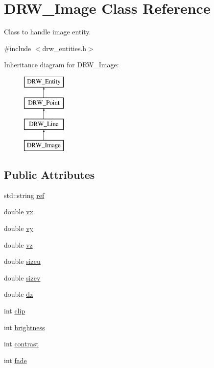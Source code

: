 \hypertarget{class_d_r_w___image}{}\section{D\+R\+W\+\_\+\+Image Class Reference}
\label{class_d_r_w___image}


Class to handle image entity.  




{\ttfamily \#include $<$drw\+\_\+entities.\+h$>$}

Inheritance diagram for D\+R\+W\+\_\+\+Image\+:\begin{figure}[H]
\begin{center}
\leavevmode
\includegraphics[height=4.000000cm]{d2/d07/class_d_r_w___image}
\end{center}
\end{figure}
\subsection*{Public Attributes}
\begin{DoxyCompactItemize}
\item 
std\+::string \hyperlink{class_d_r_w___image_a48302a8438fec582402a1c14126ffd5a}{ref}
\item 
double \hyperlink{class_d_r_w___image_a1f7b4a2b11aed54038b1e978a8d99527}{vx}
\item 
double \hyperlink{class_d_r_w___image_a955bb709e5261c3f5b3ca99bfc5765d1}{vy}
\item 
double \hyperlink{class_d_r_w___image_a075d00b1bc78bd275953d9730b0eaf8b}{vz}
\item 
double \hyperlink{class_d_r_w___image_a99a8d4b8a7fb234f002b194d0e28d247}{sizeu}
\item 
double \hyperlink{class_d_r_w___image_ae2408c33253799a6e03ea1bfec4f84d7}{sizev}
\item 
double \hyperlink{class_d_r_w___image_ada1bb1fd948f6318a4c8513e35b8224d}{dz}
\item 
int \hyperlink{class_d_r_w___image_a8d1f1854dc9b76525aa03fad3b007a58}{clip}
\item 
int \hyperlink{class_d_r_w___image_a7d088d2d2bca24de4e44cfc40e5f30bf}{brightness}
\item 
int \hyperlink{class_d_r_w___image_ad3ba08920ac1d83d073ba1f408cceb09}{contrast}
\item 
int \hyperlink{class_d_r_w___image_a29d7bf7561ed378e6f4634557aae88db}{fade}
\end{DoxyCompactItemize}
